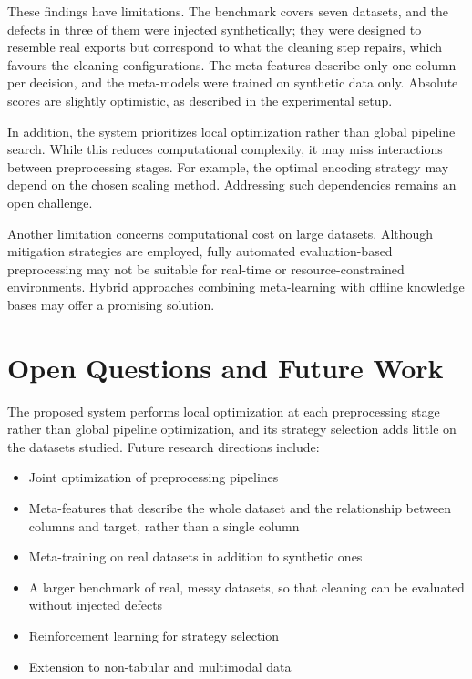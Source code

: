 \documentclass[11pt,a4paper]{article}
\begin{document}
These findings have limitations. The benchmark covers seven datasets, and the defects in three of them were injected synthetically; they were designed to resemble real exports but correspond to what the cleaning step repairs, which favours the cleaning configurations. The meta-features describe only one column per decision, and the meta-models were trained on synthetic data only. Absolute scores are slightly optimistic, as described in the experimental setup.

In addition, the system prioritizes local optimization rather than global pipeline search. While this reduces computational complexity, it may miss interactions between preprocessing stages. For example, the optimal encoding strategy may depend on the chosen scaling method. Addressing such dependencies remains an open challenge.

Another limitation concerns computational cost on large datasets. Although mitigation strategies are employed, fully automated evaluation-based preprocessing may not be suitable for real-time or resource-constrained environments. Hybrid approaches combining meta-learning with offline knowledge bases may offer a promising solution.


\section{Open Questions and Future Work}

The proposed system performs local optimization at each preprocessing stage rather than global pipeline optimization, and its strategy selection adds little on the datasets studied. Future research directions include:

\begin{itemize}
    \item Joint optimization of preprocessing pipelines
    \item Meta-features that describe the whole dataset and the relationship between columns and target, rather than a single column
    \item Meta-training on real datasets in addition to synthetic ones
    \item A larger benchmark of real, messy datasets, so that cleaning can be evaluated without injected defects
    \item Reinforcement learning for strategy selection
    \item Extension to non-tabular and multimodal data
\end{itemize}
\end{document}
